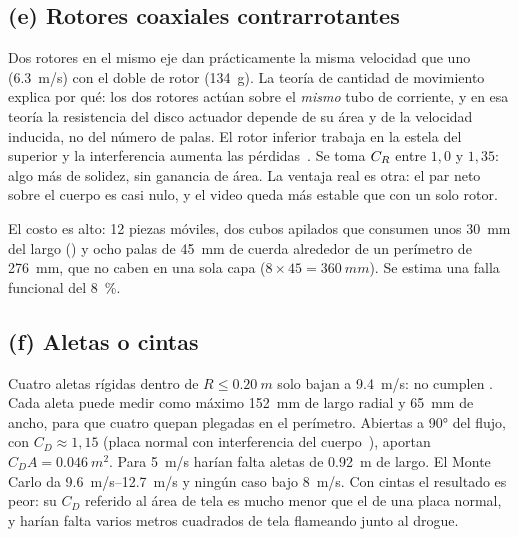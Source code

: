 \subsection{(e) Rotores coaxiales contrarrotantes}\label{sec:decision-coax}
Dos rotores en el mismo eje dan prácticamente la misma velocidad que uno
(\SI{6.3}{m/s}) con el doble de rotor (\SI{134}{g}). La teoría de cantidad de
movimiento explica por qué: los dos rotores actúan sobre el \emph{mismo} tubo de
corriente, y en esa teoría la resistencia del disco actuador depende de su área y de la
velocidad inducida, no del número de palas. El rotor inferior trabaja en la estela del superior y la interferencia aumenta
las pérdidas~\cite{decision-coleman1997,leishman2006}. Se toma $C_{R}$ entre $1{,}0$ y
$1{,}35$: algo más de solidez, sin ganancia de área. La ventaja real es otra: el par neto
sobre el cuerpo es casi nulo, y el video queda más estable que con un solo rotor.

El costo es alto: 12 piezas móviles, dos cubos apilados que consumen unos
\SI{30}{mm} del largo () y ocho palas de \SI{45}{mm} de cuerda alrededor de un
perímetro de \SI{276}{mm}, que no caben en una sola capa ($8\times45=\SI{360}{mm}$). Se
estima una falla funcional del \SI{8}{\percent}.

\subsection{(f) Aletas o cintas}\label{sec:decision-aletas}
Cuatro aletas rígidas dentro de $R\le\SI{0.20}{m}$ solo bajan a \SI{9.4}{m/s}: no cumplen
. Cada aleta puede medir como máximo \SI{152}{mm} de largo radial y \SI{65}{mm} de
ancho, para que cuatro quepan plegadas en el perímetro. Abiertas a \ang{90} del flujo,
con $C_D\approx1{,}15$ (placa normal con interferencia del cuerpo~\cite{hoerner1965}),
aportan $C_DA=\SI{0.046}{m^2}$. Para \SI{5}{m/s} harían falta aletas de
\SI{0.92}{m} de largo. El Monte Carlo da \SIrange{9.6}{12.7}{m/s} y ningún caso bajo
\SI{8}{m/s}. Con cintas el resultado es peor: su $C_D$ referido al área de tela es
mucho menor que el de una placa normal, y harían falta varios metros cuadrados de tela
flameando junto al drogue.

